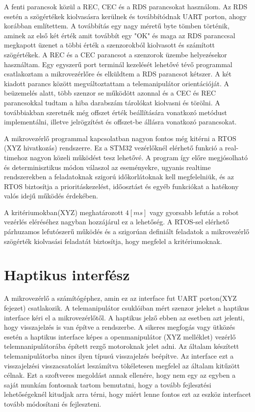 A fenti parancsok közül a REC, CEC és a RDS parancsokat használom. Az RDS esetén a szögértékek kiolvasásra kerülnek és továbbítódnak UART porton, ahogy korábban említettem. A továbbítás egy nagy méretű byte tömben történik, aminek az első két érték amit továbbít egy "OK" és maga az RDS paranccsal megkapott üzenet a többi érték a szenzorokból kiolvasott és számított szögértékek. A REC és a CEC parancsot a szenzorok üzembe helyezésekor használtam. Egy egyszerű port terminál kezelését lehetővé tévő programmal csatlakoztam a mikrovezérlőre és elküldtem a RDS parancsot kétszer. A két kiadott parancs között megváltoztattam a telemanipulátor orientációját. A beüzemelés alatt, több szenzor se működött azonnal és a CEC és REC parancsokkal tudtam a hiba darabszám tárolókat kiolvasni és törölni. A továbbiakban szeretnék még offszet érték beállítására vonatkozó metódust implementálni, illetve jelrögzítést és offszet-be állásra vonatkozó parancsokat.

A mikrovezérlő programmal kapcsolatban nagyon fontos még kitérni a RTOS (XYZ hivatkozás) rendszerre. Ez a STM32 vezérlőknél elérhető funkció a real-timehoz nagyon közeli működést tesz lehetővé. A program így előre megjósolható és determinisztikus módon válaszol az eseményekre, ugyanis realtime rendszerekben a feladatoknak szigorú időkorlátoknak kell megfelelniük, és az RTOS biztosítja a prioritáskezelést, időosztást és egyéb funkciókat a hatékony valós idejű működés érdekében.


A kritériumokban(XYZ) meghatározott $4[ms]$ vagy gyorsabb lefutás a robot vezérlés eléréséhez nagyban hozzájárul ez a lehetőség. A RTOS-sel elérhető párhuzamos lefutószerű működés és a szigorúan definiált feladatok a mikrovezérlő szögérték kiolvasási feladatát biztosítja, hogy megfelel a kritériumoknak.

\section{Haptikus interfész}

A mikrovezérlő a számítógéphez, amin ez az interface fut UART porton(XYZ fejezet) csatlakozik. A telemanipulátor csuklóiban mért szenzor jeleket a haptikus interface kéri el a mikrovezérlőtől. A haptikus jelző ebben az esetben azt jelenti, hogy visszajelzés is van építve a rendszerbe. A sikeres megfogás vagy ütközés esetén a haptikus interface képes a openmanipulátor (XYZ melléklet) vezérlő telemnanipulátorába épített rezgő motoroknak jelet adni. Az általam készített telemanipulátorba nincs ilyen típusú visszajelzés beépítve. Az interface ezt a visszajelzési visszacsatolást leszámítva tökéletesen megfelel az általam kitűzött célnak. Ezt a szoftveres megoldást annak ellenére, hogy nem egy az egyben a saját munkám fontosnak tartom bemutatni, hogy a tovább fejlesztési lehetőségeknél kitudjak arra térni, hogy miért lenne fontos ezt az eszköz interfacet tovább módosítani és fejleszteni.

